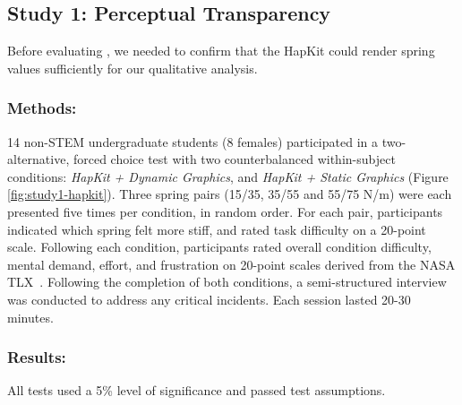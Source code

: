 \subsection{Study 1: Perceptual Transparency}
Before evaluating \SpringSim, we needed to confirm that the HapKit could render spring values sufficiently for our qualitative analysis.

\subsubsection{Methods:}

14 non-STEM undergraduate students (8 females) participated in a two-alternative, forced choice test with two counterbalanced within-subject conditions:
\textit{HapKit + Dynamic Graphics}, and \textit{HapKit + Static Graphics} (Figure \ref{fig:study1-hapkit}).
Three spring pairs (15/35, 35/55 and 55/75 N/m) were each presented five times per condition, in random order.
For each  pair, participants %
indicated which spring felt more stiff, and rated task difficulty %
on a 20-point scale. %
Following each condition, participants rated overall condition difficulty, mental demand, effort, and frustration on 20-point scales %
derived from the NASA TLX~\cite{hart_1988}.
Following the completion of both conditions, a semi-structured interview was conducted to address any critical incidents. %
Each session lasted 20-30 minutes.


%
\subsubsection{Results:}
All tests used a 5\% level of significance and passed test assumptions.


